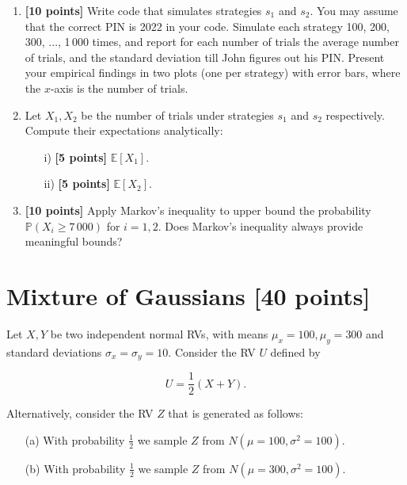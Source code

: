 \begin{tcolorbox}
\begin{enumerate}
    \item  {\bf [10 points] } Write code that simulates strategies $s_1$ and $s_2$. You may assume that the correct PIN is 2022 in your code. Simulate each strategy 100, 200, 300, ..., 1\,000 times, and report for each number of trials the average number of trials, and the standard deviation till John figures out his PIN. Present your empirical findings in two plots (one per strategy) with error bars, where the $x$-axis is the number of trials.  
    \item  Let $X_1,X_2$ be the number of trials under strategies $s_1$ and $s_2$ respectively. Compute their expectations analytically: 
    \begin{itemize}
        \item[i)]   {\bf [5 points] }$ \mathbb{E}[X_1]$.
        \item[ii)]  {\bf [5 points] } $ \mathbb{E}[X_2]$.
    \end{itemize} 


\item  {\bf [10 points] } Apply Markov's inequality to upper bound the probability $\mathbb{P}(X_i \geq 7\,000)$ for $i=1,2$.  Does Markov's inequality always provide meaningful bounds?
\end{enumerate}
\end{tcolorbox}

\newpage 

\section{Mixture of Gaussians [40 points]} 

Let $X,Y$ be two independent normal RVs, with means $\mu_x=100, \mu_y=300$ and standard deviations $\sigma_x=\sigma_y=10$. Consider the RV $U$ defined by 

$$ U = \frac{1}{2}(X+Y).$$


\noindent Alternatively,  consider the RV $Z$ that is generated as follows:

\begin{itemize}
	\item[(a)] With probability $\frac{1}{2}$ we sample $Z$ from $N(\mu=100, \sigma^2=100)$. 
	\item[(b)] With probability $\frac{1}{2}$ we sample $Z$ from $N(\mu=300, \sigma^2=100)$. 
\end{itemize}  


